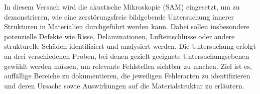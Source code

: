 In diesem Versuch wird die akustische Mikroskopie (SAM) eingesetzt, um zu demonstrieren, wie eine zerstörungsfreie bildgebende Untersuchung innerer Strukturen in Materialien durchgeführt werden kann. Dabei sollen insbesondere potenzielle Defekte wie Risse, Delaminationen, Lufteinschlüsse oder andere strukturelle Schäden identifiziert und analysiert werden.
Die Untersuchung erfolgt an drei verschiedenen Proben, bei denen gezielt geeignete Untersuchungsebenen gewählt werden müssen, um relevante Fehlstellen sichtbar zu machen. Ziel ist es, auffällige Bereiche zu dokumentieren, die jeweiligen Fehlerarten zu identifizieren und deren Ursache sowie Auswirkungen auf die Materialstruktur zu erläutern.